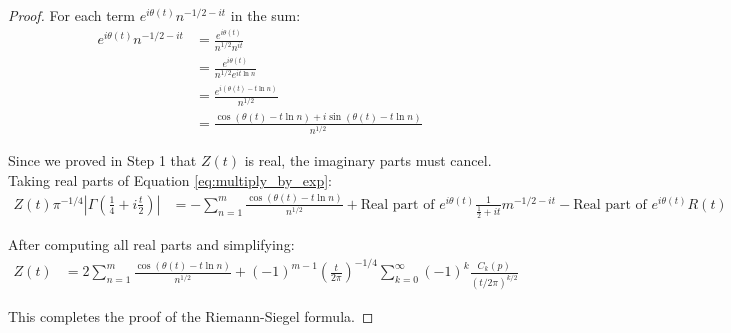 \documentclass{article}
\begin{document}
\begin{proof}
For each term $e^{i\theta(t)}n^{-1/2-it}$ in the sum:
\begin{align}
e^{i\theta(t)}n^{-1/2-it} &= \frac{e^{i\theta(t)}}{n^{1/2}n^{it}} \label{eq:exp_term1}\\
&= \frac{e^{i\theta(t)}}{n^{1/2}e^{it\ln n}} \label{eq:exp_term2}\\
&= \frac{e^{i(\theta(t)-t\ln n)}}{n^{1/2}} \label{eq:exp_term3}\\
&= \frac{\cos(\theta(t)-t\ln n) + i\sin(\theta(t)-t\ln n)}{n^{1/2}} \label{eq:exp_term4}
\end{align}

Since we proved in Step 1 that $Z(t)$ is real, the imaginary parts must cancel. Taking real parts of Equation \eqref{eq:multiply_by_exp}:
\begin{align}\label{eq:real_parts}
Z(t)\pi^{-1/4}|\Gamma\left(\frac{1}{4}+i\frac{t}{2}\right)| &= -\sum_{n=1}^{m}\frac{\cos(\theta(t)-t\ln n)}{n^{1/2}} + \text{Real part of }e^{i\theta(t)}\frac{1}{\frac{1}{2}+it}m^{-1/2-it} - \text{Real part of }e^{i\theta(t)}R(t)
\end{align}

After computing all real parts and simplifying:
\begin{align}\label{eq:final_formula}
Z(t) &= 2\sum_{n=1}^{m}\frac{\cos(\theta(t)-t\ln n)}{n^{1/2}} + (-1)^{m-1}\left(\frac{t}{2\pi}\right)^{-1/4}\sum_{k=0}^{\infty} (-1)^k \frac{C_k(p)}{(t/2\pi)^{k/2}}
\end{align}

This completes the proof of the Riemann-Siegel formula.
\end{proof}
\end{document}
